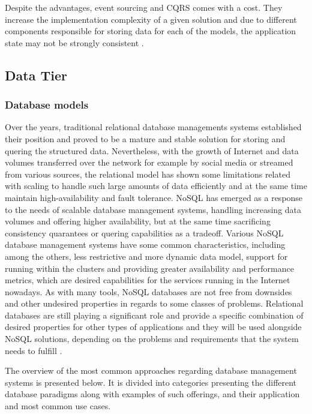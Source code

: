 Despite the advantages, event sourcing and CQRS comes with a cost. They increase the implementation complexity of a given solution and due to different components responsible for storing data for each of the models, the application state may not be strongly consistent \cite{MicroservicesArchitecture}.

\subsection{Data Tier}

\subsubsection{Database models} \label{chapter:database-paradigms}

Over the years, traditional relational database managements systems \cite{RDBMS} established their position and proved to be a mature and stable solution for storing and quering the structured data. Nevertheless, with the growth of Internet and data volumes transferred over the network for example by social media or streamed from various sources, the relational model has shown some limitations related with scaling to handle such large amounts of data efficiently and at the same time maintain high-availability and fault tolerance. NoSQL \cite{FowlerNoSQLDefinition} has emerged as a response to the needs of scalable database management systems, handling increasing data volumes and offering higher availability, but at the same time sacrificing consistency quarantees or quering capabilities as a tradeoff. Various NoSQL database management systems have some common characteristics, including among the others, less restrictive and more dynamic data model, support for running within the clusters and providing greater availability and performance metrics, which are desired capabilities for the services running in the Internet nowadays. As with many tools, NoSQL databases are not free from downsides and other undesired properties in regards to some classes of problems. Relational databases are still playing a significant role and provide a specific combination of desired properties for other types of applications and they will be used alongside NoSQL solutions, depending on the problems and requirements that the system needs to fulfill \cite{FowlerNoSQLGOTO}.

The overview of the most common approaches regarding database management systems is presented below. It is divided into categories presenting the different database paradigms along with examples of such offerings, and their application and most common use cases.

